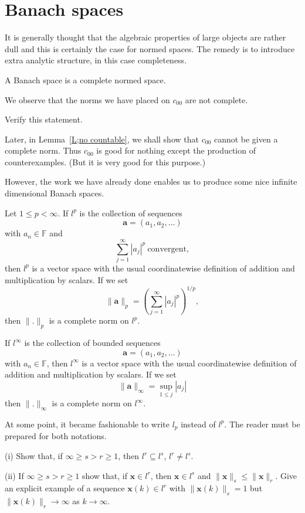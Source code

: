 \section{Banach spaces} It is generally thought that
the algebraic properties of large objects are rather dull
and this is certainly the case for normed spaces.
The remedy is to introduce extra analytic structure,
in this case completeness.
\begin{definition} A Banach space is a complete normed space.
\end{definition}
We observe that the norms we have placed on $c_{00}$
are not complete. 
\begin{exercise} Verify this statement.
\end{exercise}
Later, in Lemma~\ref{L;no countable}, 
we shall show that $c_{00}$ cannot be given a complete norm.
Thus $c_{00}$ is good for nothing except the production of counterexamples.
(But it is very good for this purpose.)
 
However, the work we have already done enables us to produce
some nice infinite dimensional Banach spaces.
\begin{theorem} Let $1\leq p<\infty$. If $l^{p}$ is
the collection of sequences 
\[{\mathbf a}=(a_{1},a_{2},\dots)\]
with $a_{n}\in{\mathbb F}$ and
\[\sum_{j=1}^{\infty}|a_{j}|^{p}\ \text{convergent},\]
then $l^{p}$ is a vector space with the usual coordinatewise
definition of addition and multiplication by scalars.
If we set
\[\|{\mathbf a}\|_{p}
=\left(\sum_{j=1}^{\infty}|a_{j}|^{p}\right)^{1/p},\]
then $\|.\|_{p}$ is a complete norm on $l^{p}$.
\end{theorem}
\begin{lemma} If $l^{\infty}$ is
the collection of bounded sequences 
\[{\mathbf a}=(a_{1},a_{2},\dots)\]
with $a_{n}\in{\mathbb F}$,
then $l^{\infty}$ is a vector space with the usual coordinatewise
definition of addition and multiplication by scalars.
If we set
\[\|{\mathbf a}\|_{\infty}=\sup_{1\leq j}|a_{j}|\]
then $\|.\|_{\infty}$ is a complete norm on $l^{\infty}$.
\end{lemma}
At some point, it became fashionable to write $l_{p}$
instead of $l^{p}$. The reader must be prepared for both notations.
\begin{exercise} (i) Show that, if $\infty\geq s>r\geq 1$,
then $l^{r}\subseteq l^{s}$, $l^{r}\neq l^{s}$.

(ii) If $\infty\geq s>r\geq 1$ show that, if ${\mathbf x}\in l^{r}$,
then ${\mathbf x}\in l^{s}$ and $\|{\mathbf x}\|_{s}\leq\|{\mathbf x}\|_{r}$.
Give an explicit example of a sequence ${\mathbf x}(k)\in l^{r}$
with $\|{\mathbf x}(k)\|_{s}=1$ but 
$\|{\mathbf x}(k)\|_{r}\rightarrow\infty$
as $k\rightarrow\infty$.
\end{exercise}


